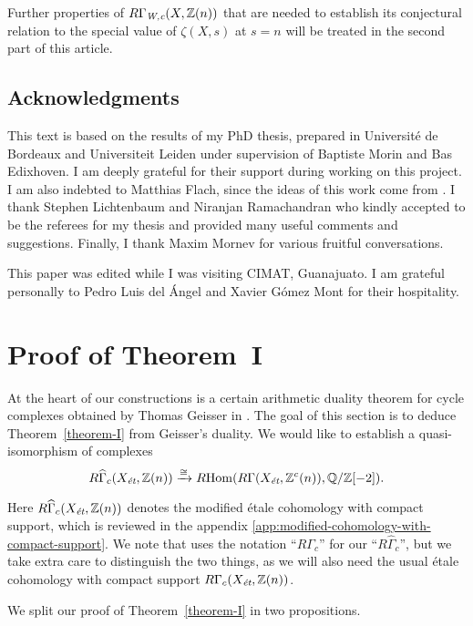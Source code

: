 \documentclass{article}
\numberwithin{equation}{section}
\begin{document}
Further properties of $R\Gamma_\Wc (X, \ZZ (n))$ that are needed to establish
its conjectural relation to the special value of $\zeta (X,s)$ at $s = n$ will
be treated in the second part of this article.

\subsection*{Acknowledgments}

This text is based on the results of my PhD thesis, prepared in Université de
Bordeaux and Universiteit Leiden under supervision of Baptiste Morin and Bas
Edixhoven. I am deeply grateful for their support during working on this
project. I am also indebted to Matthias Flach, since the ideas of this work come
from \cite{Flach-Morin-2018}. I thank Stephen Lichtenbaum and Niranjan
Ramachandran who kindly accepted to be the referees for my thesis and provided
many useful comments and suggestions. Finally, I thank Maxim Mornev for various
fruitful conversations.

This paper was edited while I was visiting CIMAT, Guanajuato. I am grateful
personally to Pedro Luis del Ángel and Xavier Gómez Mont for their hospitality.


\section{Proof of Theorem~I}
\label{sec:arithmetic-duality-theorem}

At the heart of our constructions is a certain arithmetic duality theorem for
cycle complexes obtained by Thomas Geisser in \cite{Geisser-2010}. The goal of
this section is to deduce Theorem~\ref{theorem-I} from Geisser's duality.
We would like to establish a quasi-isomorphism of complexes
\[ R\widehat{\Gamma}_c (X_\et, \ZZ (n)) \xrightarrow{\cong}
\RHom (R\Gamma (X_\et, \ZZ^c (n)), \QQ/\ZZ [-2]). \]

Here $R\widehat{\Gamma}_c (X_\et, \ZZ (n))$ denotes the modified étale
cohomology with compact support, which is reviewed in the appendix
\ref{app:modified-cohomology-with-compact-support}. We note that
\cite{Geisser-2010} uses the notation ``$R\Gamma_c$'' for our
``$R\widehat{\Gamma}_c$'', but we take extra care to distinguish the two things,
as we will also need the usual étale cohomology with compact support
$R\Gamma_c (X_\et, \ZZ (n))$.

We split our proof of Theorem~\ref{theorem-I} in two propositions.
\end{document}
